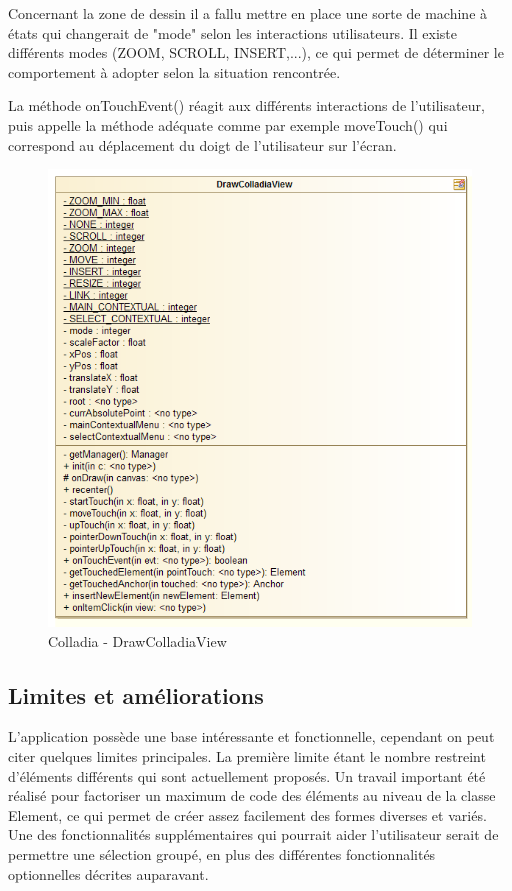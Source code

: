 Concernant la zone de dessin il a fallu mettre en place une sorte de machine à états qui changerait de "mode" selon les interactions utilisateurs. Il existe différents modes (ZOOM, SCROLL, INSERT,...), ce qui permet de déterminer le comportement à adopter selon la situation rencontrée.

La méthode onTouchEvent() réagit aux différents interactions de l'utilisateur, puis appelle la méthode adéquate comme par exemple moveTouch() qui correspond au déplacement du doigt de l'utilisateur sur l'écran.

\newpage
	\begin{figure}[!h]
		\centering
		\includegraphics[width=.8\textwidth]{img/UmlDrawView}
		\caption{Colladia - DrawColladiaView}
	\end{figure}

\subsection{Limites et améliorations}
L'application possède une base intéressante et fonctionnelle, cependant on peut citer quelques limites principales.
La première limite étant le nombre restreint d'éléments différents qui sont actuellement proposés.
Un travail important été réalisé pour factoriser un maximum de code des éléments au niveau de la classe Element, ce qui permet de créer assez facilement des formes diverses et variés.
Une des fonctionnalités supplémentaires qui pourrait aider l'utilisateur serait de permettre une sélection groupé, en plus des différentes fonctionnalités optionnelles décrites auparavant.
